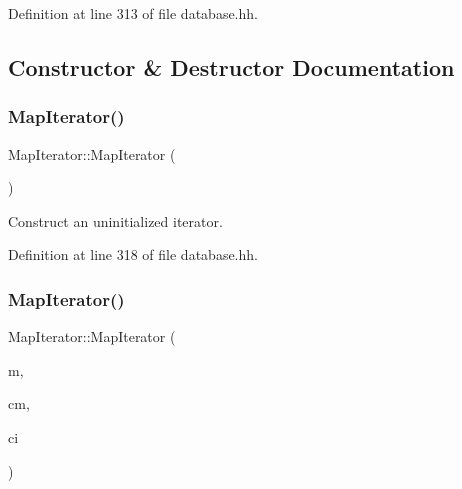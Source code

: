 Definition at line 313 of file database.\+hh.



\subsection{Constructor \& Destructor Documentation}
\mbox{\label{class_map_iterator_ab1bb98461c001151175f7df29f9f4287}} 
\subsubsection{\texorpdfstring{MapIterator()}{MapIterator()}\hspace{0.1cm}{\footnotesize\ttfamily [1/3]}}
{\footnotesize\ttfamily Map\+Iterator\+::\+Map\+Iterator (\begin{DoxyParamCaption}\item[{void}]{ }\end{DoxyParamCaption})\hspace{0.3cm}{\ttfamily [inline]}}



Construct an uninitialized iterator. 



Definition at line 318 of file database.\+hh.

\mbox{\label{class_map_iterator_a20752a5cc471c1f0d927235a64e9de04}} 
\subsubsection{\texorpdfstring{MapIterator()}{MapIterator()}\hspace{0.1cm}{\footnotesize\ttfamily [2/3]}}
{\footnotesize\ttfamily Map\+Iterator\+::\+Map\+Iterator (\begin{DoxyParamCaption}\item[{const vector$<$ \mbox{\hyperlink{database_8hh_a44a8ea0c0009b316b2651d374e5d4260}{Entry\+Map}} $\ast$ $>$ $\ast$}]{m,  }\item[{vector$<$ \mbox{\hyperlink{database_8hh_a44a8ea0c0009b316b2651d374e5d4260}{Entry\+Map}} $\ast$ $>$\+::const\+\_\+iterator}]{cm,  }\item[{list$<$ \mbox{\hyperlink{class_symbol_entry}{Symbol\+Entry}} $>$\+::const\+\_\+iterator}]{ci }\end{DoxyParamCaption})\hspace{0.3cm}{\ttfamily [inline]}}



